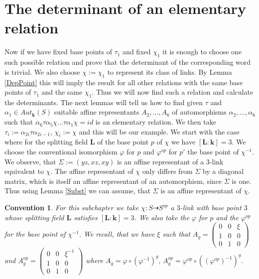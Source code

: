 \documentclass[12pt, oneside, reqno]{amsart}
\newtheorem{convention}[theorem]{Convention}
\begin{document}
\section{The determinant of an elementary relation} \label{Sec5}
\noindent Now if we have fixed base points of $\tau_1$ and fixed $\chi_1$ it is enough to choose one such possible relation and prove that the determinant of the corresponding word is trivial. We also choose $\chi:= \chi_1$ to represent its class of links. By Lemma \ref{DepPoint} this will imply the result for all other relations with the same base points of $\tau_1$ and the same $\chi_1$. Thus we will now find such a relation and calculate the determinants. The next lemmas will tell us how to find given $\tau$ and $\alpha_1 \in Aut_{\textbf{k}}(S)$ suitable affine representants $A_2, \dots , A_6$ of automorphisms $\alpha_2, \dots , \alpha_6$ such that $\alpha_6 \tau \alpha_5 \chi \dots \tau \alpha_1 \chi = id$ is an elementary relation. We then take $\tau_i := \alpha_{2i} \tau \alpha_{2i-1}, \, \chi_i:= \chi$ and this will be our example. We start with the case where for the splitting field $\textbf{L}$ of the base point $p$ of $\chi$ we have $[\textbf{L}:\textbf{k}] = 3$. We choose the conventional isomorphism $\varphi$ for $p$ and $\varphi^{op}$ for $p'$ the base point of $\chi^{-1}$. We observe, that $\Sigma := (yz,xz,xy)$ is an affine representant of a $3$-link equivalent to $\chi$. The affine representant of $\chi$ only differs from $\Sigma$ by a diagonal matrix, which is itself an affine representant of an automorphism, since $\Sigma$ is one. Thus using Lemma \ref{Subst} we can assume, that $\Sigma$ is an affine representant of $\chi$. 
\begin{convention}
    For this subchapter we take $\chi:S \dashrightarrow S^{op}$ a $3$-link with base point $3$ whose splitting field $\textbf{L}$ satisfies $[\textbf{L}:\textbf{k}] = 3$. We also take the $\varphi$ for $p$ and the $\varphi^{op}$ for the base point of $\chi^{-1}$. We recall, that we have $\xi$ such that $A_g = \begin{pmatrix}
        0 & 0 & \xi \\
        1 & 0 & 0 \\
        0 & 1 & 0
    \end{pmatrix}$ and $A_g^{op} = \begin{pmatrix}
        0 & 0 & \xi^{-1} \\
        1 & 0 & 0 \\
        0 & 1 & 0
    \end{pmatrix}$ where $A_g = \varphi \circ (\varphi^{-1})^g, \, A_g^{op} = \varphi^{op} \circ ((\varphi^{op})^{-1})^g$.
\end{convention}
\end{document}
